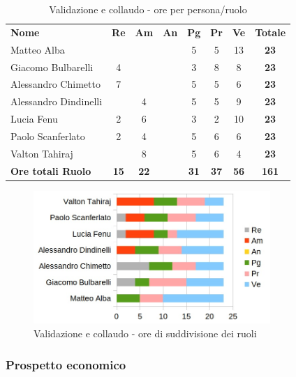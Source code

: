 		\begin{table} [h!]
			\begin{center}
				\begin{tabular} { m{3.5cm} c c c c c c c }
					\rowcolor{lightgray}
					\textbf{Nome} & \textbf{Re} & \textbf{Am} & \textbf{An} & \textbf{Pg} & \textbf{Pr} & \textbf{Ve} & \textbf{Totale} \\
					Matteo Alba & & & & 5 & 5 & 13 & \textbf{23} \\
					Giacomo Bulbarelli & 4 & & & 3 & 8 & 8 & \textbf{23} \\
					Alessandro Chimetto & 7 & & & 5 & 5 & 6 & \textbf{23} \\
					Alessandro Dindinelli & & 4 & & 5 & 5 & 9 & \textbf{23} \\
					Lucia Fenu & 2 & 6 & & 3 & 2 & 10 & \textbf{23} \\
					Paolo Scanferlato & 2 & 4 & & 5 & 6 & 6 & \textbf{23} \\
					Valton Tahiraj & & 8 & & 5 & 6 & 4 & \textbf{23} \\
					\textbf{Ore totali Ruolo} & \textbf{15} & \textbf{22} & \textbf{} & \textbf{31} & \textbf{37}& \textbf{56} & \textbf{161}
				\end{tabular}
				\caption{Validazione e collaudo - ore per persona/ruolo}
			\end{center}
		\end{table}
	
		\begin{figure} [h!]
			\centering
			\includegraphics[width=0.8\textwidth]{res/img/grafici/validazione_e_collaudo_ore_ruolo.jpg}
			\caption{Validazione e collaudo - ore di suddivisione dei ruoli} 
		\end{figure}
	
	\newpage
	
	\subsubsection{Prospetto economico}
	
